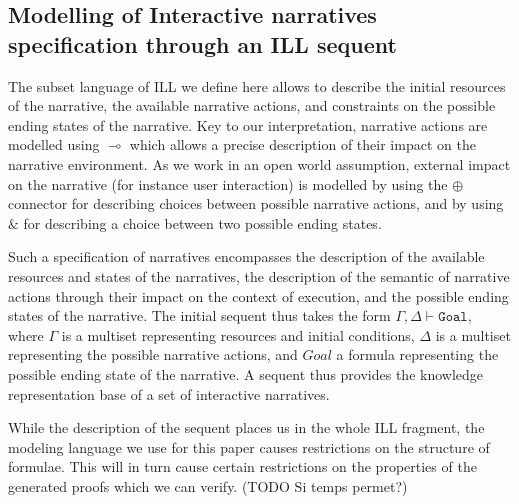 \documentclass[runningheads,a4paper]{llncs}
\begin{document}
\subsection{Modelling of Interactive narratives specification through an ILL sequent}
%
The subset language of ILL we define here allows to describe the initial resources of the narrative, the available narrative actions, and constraints on the possible ending states of the narrative. Key to our interpretation, narrative actions are modelled using $\multimap$ which allows a precise description of their impact on the narrative environment. As we work in an open world assumption, external impact on the narrative (for instance user interaction) is modelled by using the $\oplus$ connector for describing choices between possible narrative actions, and by using $\&$ for describing a choice between two possible ending states.

Such a specification of narratives encompasses the description of the available resources and states of the narratives, the description of the semantic of narrative actions through their impact on the context of execution, and the possible ending states of the narrative. The initial sequent thus takes the form $\Gamma , \Delta \vdash \mathtt{Goal}$, where $\Gamma$ is a multiset representing resources and initial conditions, $\Delta$ is a multiset representing the possible narrative actions, and $Goal$ a formula representing the possible ending state of the narrative. A sequent thus provides the knowledge representation base of a set of interactive narratives. 

While the description of the sequent places us in the whole ILL fragment, the modeling language we use for this paper causes restrictions on the structure of formulae. This will in turn cause certain restrictions on the properties of the generated proofs which we can verify. (TODO Si temps permet?)
\end{document}
